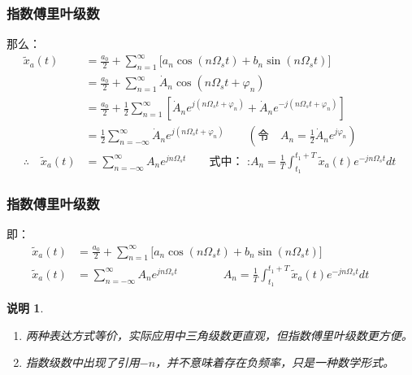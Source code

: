 \documentclass[notheorems,compress,mathserif,table]{beamer}
\newtheorem{shuoming}{说明}
\begin{document}
\begin{frame}[shrink]\frametitle{指数傅里叶级数}%
那么：
\begin{equation*}
       \begin{split}
       \tilde{x}_a(t) &= \frac{a_0}{2}+\sum_{n=1}^{\infty}\Big[a_n \cos(n \Omega_s t)+ b_n \sin(n \Omega_s t)\Big] \qquad\qquad\qquad\\
                      &= \frac{a_0}{2}+\sum_{n=1}^{\infty}\dot{A}_n \cos(n \Omega_s t +\varphi_n) \\
                      &= \frac{a_0}{2}+\frac{1}{2}\sum_{n=1}^{\infty} \left[\dot{A}_n e^{j(n \Omega_s t +\varphi_n)}+
                           \dot{A}_n e^{-j(n \Omega_s t +\varphi_n)}\right] \\
                      &= \frac{1}{2}\sum_{n=-\infty}^{\infty}\dot{A}_n e^{j(n \Omega_s t +\varphi_n)}\qquad   \left(\mbox{令}\quad A_n = \frac{1}{2}\dot{A}_n e^{j\varphi_n}\right)\\
       \therefore\quad \tilde{x}_a(t)
                      &= \sum_{n=-\infty}^{\infty} A_n e^{j n \Omega_s t}     \qquad \mbox{式中：\ :}A_n = \frac{1}{T}\int_{t_1}^{t_1+T}\tilde{x}_a(t)e^{-jn\Omega_s t}dt
           \end{split}
        \end{equation*}
 \end{frame}
%
%
%
\begin{frame}[shrink]\frametitle{指数傅里叶级数}%
即：
\begin{equation*}
\begin{split}
\tilde{x}_a(t)   &= \frac{a_0}{2}+\sum_{n=1}^{\infty}\Big[a_n \cos(n \Omega_s t)+ b_n \sin(n \Omega_s t)\Big] \qquad\qquad\qquad\\
\tilde{x}_a(t)   &= \sum_{n=-\infty}^{\infty} A_n e^{j n \Omega_s t} \qquad \qquad A_n = \frac{1}{T}\int_{t_1}^{t_1+T}\tilde{x}_a(t)e^{-jn\Omega_s t}dt
\end{split}
\end{equation*}
 \begin{shuoming}
\begin{enumerate}
	\item 两种表达方式等价，实际应用中三角级数更直观，但指数傅里叶级数更方便。
	\item 指数级数中出现了引用$-n$，并不意味着存在负频率，只是一种数学形式。
\end{enumerate}
 \end{shuoming}

\end{frame}
%
%
%
\end{document}
